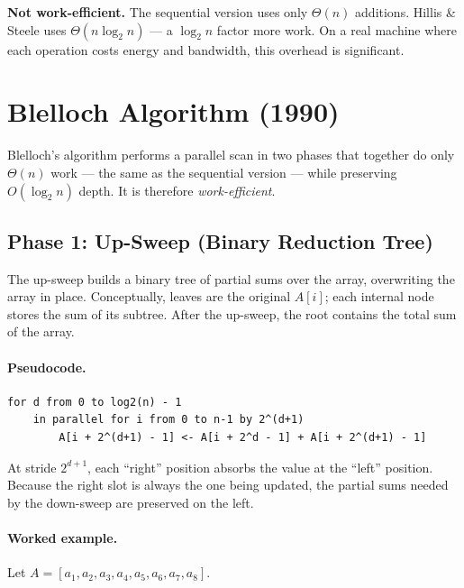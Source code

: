 \begin{pppitfall}
\textbf{Not work-efficient.} The sequential version uses only
$\Theta(n)$ additions. Hillis \& Steele uses $\Theta(n \log_2 n)$ ---
a $\log_2 n$ factor more work. On a real machine where each operation
costs energy and bandwidth, this overhead is significant.
\end{pppitfall}

\section{Blelloch Algorithm (1990)}
\label{sec:blelloch}

Blelloch's algorithm performs a parallel scan in two phases that together
do only $\Theta(n)$ work --- the same as the sequential version --- while
preserving $O(\log_2 n)$ depth. It is therefore \emph{work-efficient}.

\subsection{Phase 1: Up-Sweep (Binary Reduction Tree)}
\label{sec:upsweep}

The up-sweep builds a binary tree of partial sums over the array,
overwriting the array in place. Conceptually, leaves are the original
$A[i]$; each internal node stores the sum of its subtree. After the
up-sweep, the root contains the total sum of the array.

\paragraph{Pseudocode.}
\begin{lstlisting}[caption={Blelloch up-sweep (in-place)}]
for d from 0 to log2(n) - 1
    in parallel for i from 0 to n-1 by 2^(d+1)
        A[i + 2^(d+1) - 1] <- A[i + 2^d - 1] + A[i + 2^(d+1) - 1]
\end{lstlisting}

At stride $2^{d+1}$, each ``right'' position absorbs the value at the
``left'' position. Because the right slot is always the one being updated,
the partial sums needed by the down-sweep are preserved on the left.

\paragraph{Worked example.}
Let $A = [a_1, a_2, a_3, a_4, a_5, a_6, a_7, a_8]$.


